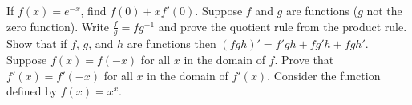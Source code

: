 \begin{questions}
  \questioA If $ f(x) = e^{-x} $, find $ f(0) + xf'(0) $.
  \questioM Suppose $ f $ and $ g $ are functions ($ g $ not the zero function). Write $ \frac{f}{g} = fg^{-1} $ and
            prove the quotient rule from the product rule.
  \questioM Show that if $ f $, $ g $, and $ h $ are functions then $ (fgh)' = f'gh + fg'h + fgh' $.
  \questioE Suppose $ f(x) = f(-x) $ for all $ x $ in the domain of $ f $. Prove that $ f'(x) = f'(-x) $ for all $ x $
            in the domain of $ f'(x) $.
  \questioE Consider the function defined by $ f(x) = x^x $.
\end{questions}
